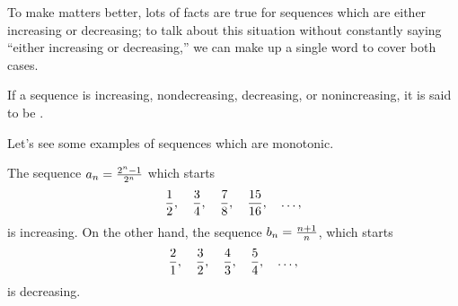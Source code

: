 \documentclass{ximera}
\begin{document}
To make matters better, lots of facts are true for sequences which are
either increasing or decreasing; to talk about this situation without
constantly saying ``either increasing or decreasing,'' we can make up
a single word to cover both cases.
\begin{definition}
  If a sequence is increasing, nondecreasing, decreasing, or
  nonincreasing, it is said to be .
\end{definition}


Let's see some examples of sequences which are monotonic.
\begin{example}
The sequence $ a_n = {2^n-1\over2^n}$ which starts
$$
  {1\over2},\quad {3\over4},\quad {7\over8},\quad {15\over16},\quad \ldots,
$$
is increasing.  On the other hand, the sequence $ b_n = {n+1\over n}$, which starts
$$ 
  {2\over1},\quad{3\over2},\quad{4\over3},\quad{5\over4},\quad\ldots,
$$
is decreasing.
\end{example}
\end{document}

